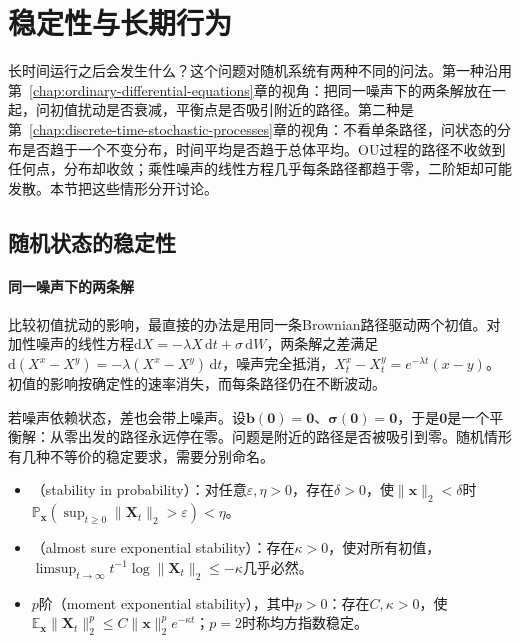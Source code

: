 \section{稳定性与长期行为}
\label{sec:ctsp-stability}

长时间运行之后会发生什么？这个问题对随机系统有两种不同的问法。第一种沿用第~\ref{chap:ordinary-differential-equations}章的视角：把同一噪声下的两条解放在一起，问初值扰动是否衰减，平衡点是否吸引附近的路径。第二种是第~\ref{chap:discrete-time-stochastic-processes}章的视角：不看单条路径，问状态的分布是否趋于一个不变分布，时间平均是否趋于总体平均。OU过程的路径不收敛到任何点，分布却收敛；乘性噪声的线性方程几乎每条路径都趋于零，二阶矩却可能发散。本节把这些情形分开讨论。

\subsection{随机状态的稳定性}
\label{sec:ctsp-stochastic-stability}

\paragraph{同一噪声下的两条解}
比较初值扰动的影响，最直接的办法是用同一条Brownian路径驱动两个初值。对加性噪声的线性方程$\mathrm dX=-\lambda X\,\mathrm dt+\sigma\,\mathrm dW$，两条解之差满足$\mathrm d(X^x-X^y)=-\lambda(X^x-X^y)\,\mathrm dt$，噪声完全抵消，$X^x_t-X^y_t=e^{-\lambda t}(x-y)$。初值的影响按确定性的速率消失，而每条路径仍在不断波动。

若噪声依赖状态，差也会带上噪声。设$\bm b(\bm0)=\bm0$、$\bm\sigma(\bm0)=\bm0$，于是$\bm0$是一个平衡解：从零出发的路径永远停在零。问题是附近的路径是否被吸引到零。随机情形有几种不等价的稳定要求，需要分别命名。
\begin{itemize}
  \item {}（stability in probability）：对任意$\varepsilon,\eta>0$，存在$\delta>0$，使$\|\bm x\|_2<\delta$时$\mathbb P_{\bm x}(\sup_{t\geq0}\|\bm X_t\|_2>\varepsilon)<\eta$。
  \item {}（almost sure exponential stability）：存在$\kappa>0$，使对所有初值，$\limsup_{t\to\infty}t^{-1}\log\|\bm X_t\|_2\leq-\kappa$几乎必然。
  \item $p$阶（moment exponential stability），其中$p>0$：存在$C,\kappa>0$，使$\mathbb E_{\bm x}\|\bm X_t\|_2^p\leq C\|\bm x\|_2^pe^{-\kappa t}$；$p=2$时称均方指数稳定。
\end{itemize}

